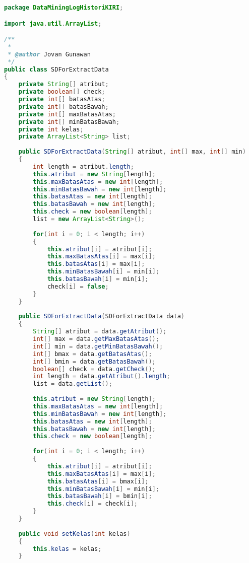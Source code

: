 \begin{lstlisting}[language=Java,basicstyle=\tiny,caption=SDForExtractData.java]
package DataMiningLogHistoriKIRI;

import java.util.ArrayList;

/**
 *
 * @author Jovan Gunawan
 */
public class SDForExtractData 
{
    private String[] atribut;
    private boolean[] check;
    private int[] batasAtas;
    private int[] batasBawah;
    private int[] maxBatasAtas;
    private int[] minBatasBawah;
    private int kelas;
    private ArrayList<String> list;
    
    public SDForExtractData(String[] atribut, int[] max, int[] min)
    {
        int length = atribut.length;
        this.atribut = new String[length];
        this.maxBatasAtas = new int[length];
        this.minBatasBawah = new int[length];
        this.batasAtas = new int[length];
        this.batasBawah = new int[length];
        this.check = new boolean[length];
        list = new ArrayList<String>();
        
        for(int i = 0; i < length; i++)
        {
            this.atribut[i] = atribut[i];
            this.maxBatasAtas[i] = max[i];
            this.batasAtas[i] = max[i];
            this.minBatasBawah[i] = min[i];
            this.batasBawah[i] = min[i];
            check[i] = false;
        }
    }
    
    public SDForExtractData(SDForExtractData data)
    {
        String[] atribut = data.getAtribut();
        int[] max = data.getMaxBatasAtas();
        int[] min = data.getMinBatasBawah();
        int[] bmax = data.getBatasAtas();
        int[] bmin = data.getBatasBawah();
        boolean[] check = data.getCheck();
        int length = data.getAtribut().length;
        list = data.getList();
        
        this.atribut = new String[length];
        this.maxBatasAtas = new int[length];
        this.minBatasBawah = new int[length];
        this.batasAtas = new int[length];
        this.batasBawah = new int[length];
        this.check = new boolean[length];
        
        for(int i = 0; i < length; i++)
        {
            this.atribut[i] = atribut[i];
            this.maxBatasAtas[i] = max[i];
            this.batasAtas[i] = bmax[i];
            this.minBatasBawah[i] = min[i];
            this.batasBawah[i] = bmin[i];
            this.check[i] = check[i];
        }
    }
    
    public void setKelas(int kelas)
    {
        this.kelas = kelas;
    }
    

\end{lstlisting}
